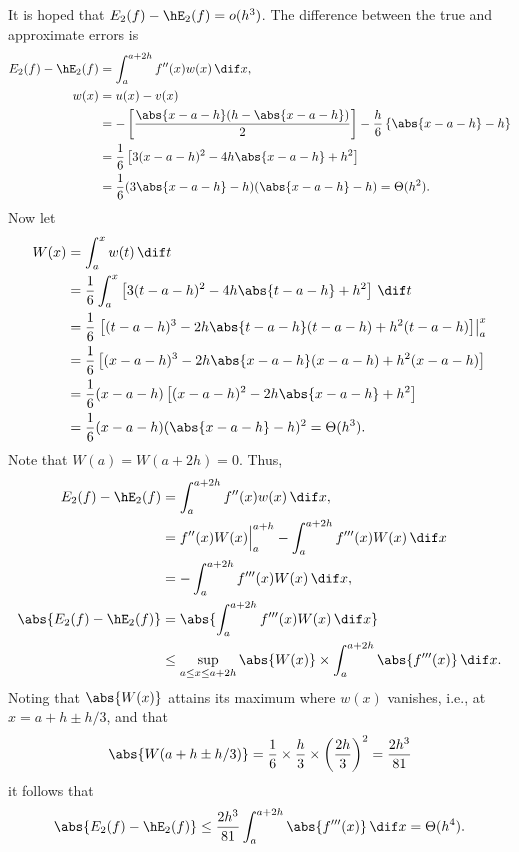 \documentclass[]{elsarticle}
\theoremstyle{definition}
\theoremstyle{remark}
\begin{document}
It is hoped that $E_2(f) - \hE_2(f) = o(h^3)$.  The difference between the true and approximate errors is 
\begin{align*}
E_2(f) - \hE_2(f) &= \int_a^{a+2h} f''(x) w(x) \, \dif x, \\
w(x) &= u(x) - v(x) \\
&= -\left[\frac{\abs{x-a-h}(h-\abs{x-a-h})}{2}\right] -  \frac{h}{6} \left\{ \abs{x-a-h} - h \right\}\\
&=\frac{1}{6} \left[3 (x-a-h)^2 - 4 h \abs{x-a-h} + h^2\right] \\
&=\frac{1}{6} (3 \abs{x-a-h} - h)( \abs{x-a-h} - h) = \Theta(h^2).
\end{align*}
Now let 
\begin{align*}
W(x) &= \int_{a}^x w(t) \, \dif t \\
&=\frac{1}{6} \int_{a}^x \left[3 (t-a-h)^2 - 4 h \abs{t-a-h} + h^2\right] \, \dif t\\
&=\frac{1}{6} \left . \left[(t-a-h)^3 - 2 h \abs{t-a-h}(t-a-h) + h^2 (t-a-h)\right] \right \rvert_a^x \\
&=\frac{1}{6}  \left[(x-a-h)^3 - 2 h \abs{x-a-h}(x-a-h) + h^2 (x-a-h)\right] \\
&=\frac{1}{6}  (x-a-h)\left[(x-a-h)^2 - 2 h \abs{x-a-h} + h^2\right] \\
&=\frac{1}{6}  (x-a-h)(\abs{x-a-h} - h)^2 = \Theta(h^3).
\end{align*}
Note that $W(a)=W(a+2h)=0$.  Thus,
\begin{align*}
E_2(f) - \hE_2(f) &= \int_a^{a+2h} f''(x) w(x) \, \dif x, \\
&= f''(x) W(x) \Bigr \rvert_a^{a+h} - \int_a^{a+2h} f'''(x) W(x) \, \dif x \\
&= - \int_a^{a+2h} f'''(x) W(x) \, \dif x, \\
\abs{E_2(f) - \hE_2(f)} &=\abs{\int_a^{a+2h} f'''(x) W(x) \, \dif x} \\
&\le \sup_{a \le x \le a+2h} \abs{W(x)} \times \int_a^{a+2h} \abs{f'''(x)} \, \dif x.
\end{align*}
Noting that $\abs{W(x)}$ attains its maximum where $w(x)$ vanishes, i.e., at $x=a+h \pm h/3$, and that
\[
\abs{W(a+h \pm h/3)}= \frac{1}{6} \times \frac{h}{3} \times \left(\frac{2h}{3}\right)^2 = \frac{2h^3}{81}
\]
it follows that 
\begin{equation*}
\abs{E_2(f) - \hE_2(f)} \le \frac{2h^3}{81} \int_a^{a+2h} \abs{f'''(x)} \, \dif x = \Theta(h^4).
\end{equation*}
\end{document}
